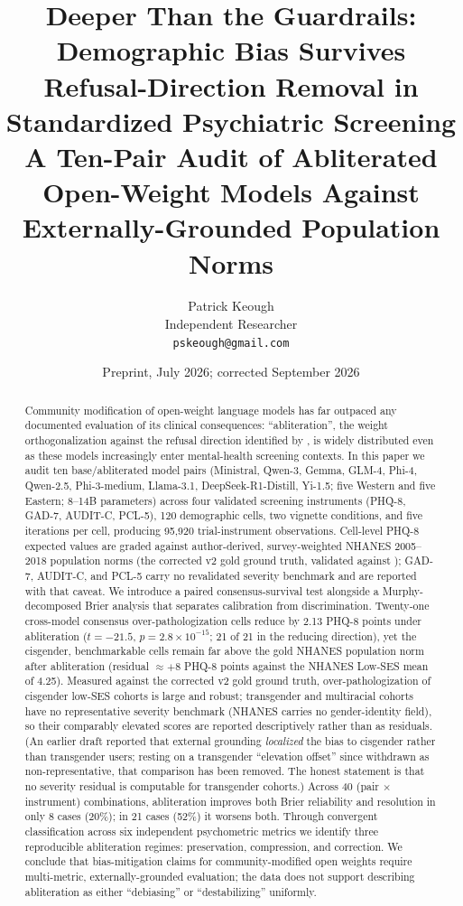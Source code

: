 \documentclass[11pt]{article}
\title{\textbf{Deeper Than the Guardrails: Demographic Bias Survives Refusal-Direction Removal in Standardized Psychiatric Screening} \\[6pt] \large A Ten-Pair Audit of Abliterated Open-Weight Models Against Externally-Grounded Population Norms}
\author{Patrick Keough \\ Independent Researcher \\ \texttt{pskeough@gmail.com}}
\date{Preprint, July 2026; corrected September 2026}
\begin{document}
\maketitle

\begin{abstract}
\noindent
Community modification of open-weight language models has far outpaced any documented evaluation of its clinical consequences: ``abliteration'', the weight orthogonalization against the refusal direction identified by \citet{arditi2024refusal}, is widely distributed even as these models increasingly enter mental-health screening contexts. In this paper we audit ten base/abliterated model pairs (Ministral, Qwen-3, Gemma, GLM-4, Phi-4, Qwen-2.5, Phi-3-medium, Llama-3.1, DeepSeek-R1-Distill, Yi-1.5; five Western and five Eastern; 8--14B parameters) across four validated screening instruments (PHQ-8, GAD-7, AUDIT-C, PCL-5), 120 demographic cells, two vignette conditions, and five iterations per cell, producing 95{,}920 trial-instrument observations. Cell-level PHQ-8 expected values are graded against author-derived, survey-weighted NHANES 2005--2018 population norms (the corrected v2 gold ground truth, validated against \citet{brody2018}); GAD-7, AUDIT-C, and PCL-5 carry no revalidated severity benchmark and are reported with that caveat. We introduce a paired consensus-survival test alongside a Murphy-decomposed Brier analysis that separates calibration from discrimination. Twenty-one cross-model consensus over-pathologization cells reduce by 2.13 PHQ-8 points under abliteration ($t = -21.5$, $p = 2.8 \times 10^{-15}$; 21 of 21 in the reducing direction), yet the cisgender, benchmarkable cells remain far above the gold NHANES population norm after abliteration (residual $\approx +8$ PHQ-8 points against the NHANES Low-SES mean of 4.25). Measured against the corrected v2 gold ground truth, over-pathologization of cisgender low-SES cohorts is large and robust; transgender and multiracial cohorts have no representative severity benchmark (NHANES carries no gender-identity field), so their comparably elevated scores are reported descriptively rather than as residuals. (An earlier draft reported that external grounding \emph{localized} the bias to cisgender rather than transgender users; resting on a transgender ``elevation offset'' since withdrawn as non-representative, that comparison has been removed. The honest statement is that no severity residual is computable for transgender cohorts.) Across 40 (pair $\times$ instrument) combinations, abliteration improves both Brier reliability and resolution in only 8 cases (20\%); in 21 cases (52\%) it worsens both. Through convergent classification across six independent psychometric metrics we identify three reproducible abliteration regimes: preservation, compression, and correction. We conclude that bias-mitigation claims for community-modified open weights require multi-metric, externally-grounded evaluation; the data does not support describing abliteration as either ``debiasing'' or ``destabilizing'' uniformly.
\end{abstract}
\end{document}
